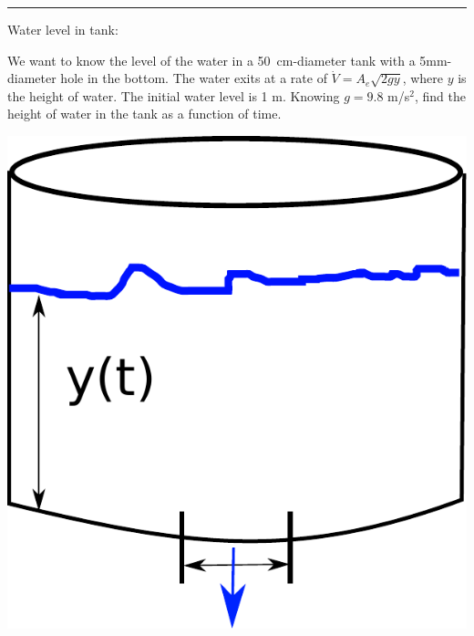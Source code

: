 \begin{center}
\noindent\rule{4cm}{0.4pt}
\end{center}


\begin{exmp}{Water level in tank:}\\
\begin{minipage}{0.65\textwidth}
We want to know the level of the water in a 50~cm-diameter tank with a 5mm-diameter hole in the bottom. The water exits at a rate of $\dot{V}=A_e \sqrt{2gy}$, where  $y$ is the height of water. The initial water level is 1 m. Knowing $g=9.8$ m/s$^2$, find the height of water in the tank as a function of time.\\
\end{minipage}
\hspace{0.05\textwidth}
\begin{minipage}{0.27\textwidth}
\centering
\includegraphics[width=\textwidth]{figs/tankProblem.pdf} 
\end{minipage}


\end{exmp}
